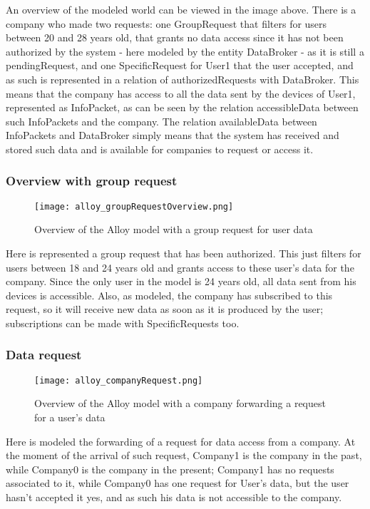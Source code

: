 \documentclass[../main.tex]{subfiles}
\begin{document}
An overview of the modeled world can be viewed in the image above. There is a company who made two requests: one GroupRequest that filters for users between 20 and 28 years old, that grants no data access since it has not been authorized by the system - here modeled by the entity DataBroker - as it is still a pendingRequest, and one SpecificRequest for User1 that the user accepted, and as such is represented in a relation of authorizedRequests with DataBroker. This means that the company has access to all the data sent by the devices of User1, represented as InfoPacket, as can be seen by the relation accessibleData between such InfoPackets and the company. The relation availableData between InfoPackets and DataBroker simply means that the system has received and stored such data and is available for companies to request or access it.
\newpage

\subsubsection{Overview with group request}

\begin{figure}[h!]
	\texttt{[image: alloy\_groupRequestOverview.png]}
	\caption{Overview of the Alloy model with a group request for user data}
	\label{fig:alloy_groupRequestOverview}
\end{figure}

Here is represented a group request that has been authorized. This just filters for users between 18 and 24 years old and grants access to these user's data for the company. Since the only user in the model is 24 years old, all data sent from his devices is accessible. Also, as modeled, the company has subscribed to this request, so it will receive new data as soon as it is produced by the user; subscriptions can be made with SpecificRequests too.
\newpage

\subsubsection{Data request}

\begin{figure}[h!]
	\texttt{[image: alloy\_companyRequest.png]}
	\caption{Overview of the Alloy model with a company forwarding a request for a user's data}
	\label{fig:alloy_companyRequest}
\end{figure}

Here is modeled the forwarding of a request for data access from a company. At the moment of the arrival of such request, Company1 is the company in the past, while Company0 is the company in the present; Company1 has no requests associated to it, while Company0 has one request for User's data, but the user hasn't accepted it yes, and as such his data is not accessible to the company.
\newpage
\end{document}
